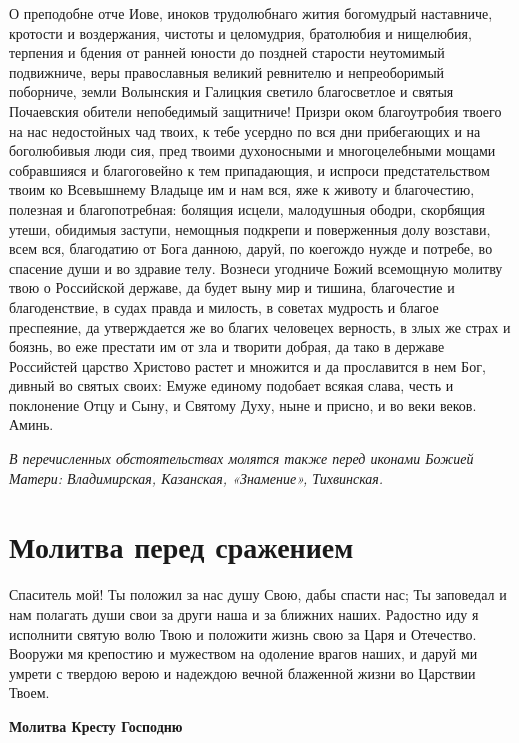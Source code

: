 О преподобне отче Иове, иноков трудолюбнаго жития богомудрый наставниче, кротости и воздержания, чистоты и целомудрия, братолюбия и нищелюбия, терпения и бдения от ранней юности до поздней старости неутомимый подвижниче, веры православныя великий ревнителю и непреоборимый поборниче, земли Волынския и Галицкия светило благосветлое и святыя Почаевския обители непобедимый защитниче! Призри оком благоутробия твоего на нас недостойных чад твоих, к тебе усердно по вся дни прибегающих и на боголюбивыя люди сия, пред твоими духоносными и многоцелебными мощами собравшияся и благоговейно к тем припадающия, и испроси предстательством твоим ко Всевышнему Владыце им и нам вся, яже к животу и благочестию, полезная и благопотребная: болящия исцели, малодушныя ободри, скорбящия утеши, обидимыя заступи, немощныя подкрепи и поверженныя долу возстави, всем вся, благодатию от Бога данною, даруй, по коегождо нужде и потребе, во спасение души и во здравие телу. Вознеси угодниче Божий всемощную молитву твою о Российской державе, да будет выну мир и тишина, благочестие и благоденствие, в судах правда и милость, в советах мудрость и благое преспеяние, да утверждается же во благих человецех верность, в злых же страх и боязнь, во еже престати им от зла и творити добрая, да тако в державе Российстей царство Христово растет и множится и да прославится в нем Бог, дивный во святых своих: Емуже единому подобает всякая слава, честь и поклонение Отцу и Сыну, и Святому Духу, ныне и присно, и во веки веков. Аминь.


\itshape В перечисленных обстоятельствах молятся также перед иконами Божией Матери: Владимирская, Казанская, «Знамение», Тихвинская.\normalfont{}

\section{Молитва перед сражением}
 

Спаситель мой! Ты положил за нас душу Свою, дабы спасти нас; Ты заповедал и нам полагать души свои за други наша и за ближних наших. Радостно иду я исполнити святую волю Твою и положити жизнь свою за Царя и Отечество. Вооружи мя крепостию и мужеством на одоление врагов наших, и даруй ми умрети с твердою верою и надеждою вечной блаженной жизни во Царствии Твоем.


\medskip


\bfseries Молитва Кресту Господню\normalfont{}\nopagebreak


